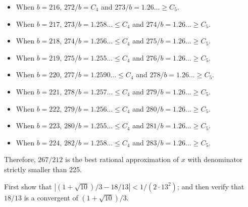 \begin{solution}
\begin{enumerate}
\begin{itemize}
            \item When $b = 216$, $272/b = C_4$ and $273/b = 1.26... \geq C_5$.
            \item When $b = 217$, $273/b = 1.258... \leq C_4$ and $274/b = 1.26... \geq C_5$.
            \item When $b = 218$, $274/b = 1.256... \leq C_4$ and $275/b = 1.26... \geq C_5$.
            \item When $b = 219$, $275/b = 1.255... \leq C_4$ and $276/b = 1.26... \geq C_5$.
            \item When $b = 220$, $277/b = 1.2590... \leq C_4$ and $278/b = 1.26... \geq C_5$.
            \item When $b = 221$, $278/b = 1.257... \leq C_4$ and $279/b = 1.26... \geq C_5$.
            \item When $b = 222$, $279/b = 1.256... \leq C_4$ and $280/b = 1.26... \geq C_5$.
            \item When $b = 223$, $280/b = 1.255... \leq C_4$ and $281/b = 1.26... \geq C_5$.
            \item When $b = 224$, $282/b = 1.258... \leq C_4$ and $283/b = 1.26... \geq C_5$.
        \end{itemize}
        Therefore, $267/212$ is the best rational approximation of $x$ with denominator strictly smaller than 225. \\
    \end{enumerate}
\end{solution}

\begin{exercise}
    First show that $|(1+ \sqrt{10})/3 - 18/13| < 1 / (2\cdot 13^2)$; and then verify that $18/13$ is a convergent of $(1+ \sqrt{10})/3$. \\
\end{exercise}

